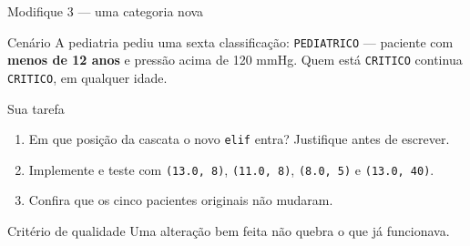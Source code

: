 \documentclass[aspectratio=169]{beamer}
\newcommand{\code}[1]{\texttt{\small #1}}
\begin{document}
\begin{frame}[shrink=8]{Modifique 3 --- uma categoria nova}
  \begin{block}{Cenário}
    {\small A pediatria pediu uma sexta classificação:
    \code{PEDIATRICO} --- paciente com \textbf{menos de 12 anos} e
    pressão acima de 120 mmHg. Quem está \code{CRITICO} continua
    \code{CRITICO}, em qualquer idade.}
  \end{block}

  \vspace{0.15cm}
  \begin{block}{Sua tarefa}
    \small
    \begin{enumerate}
      \item Em que posição da cascata o novo \code{elif} entra?
            Justifique antes de escrever.
      \item Implemente e teste com \code{(13.0, 8)}, \code{(11.0, 8)},
            \code{(8.0, 5)} e \code{(13.0, 40)}.
      \item Confira que os cinco pacientes originais não mudaram.
    \end{enumerate}
  \end{block}

  \vspace{0.15cm}
  \begin{alertblock}{Critério de qualidade}
    {\small Uma alteração bem feita não quebra o que já funcionava.}
  \end{alertblock}
\end{frame}
\end{document}
